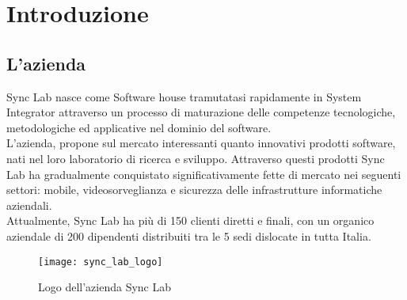 
\chapter{Introduzione}
\label{cap:introduzione}





\section{L'azienda}

Sync Lab nasce come Software house tramutatasi rapidamente in System Integrator attraverso un processo di maturazione delle competenze tecnologiche, metodologiche ed applicative nel dominio del software. \\
L'azienda, propone sul mercato interessanti quanto innovativi prodotti software, nati nel loro laboratorio di ricerca e sviluppo. Attraverso questi prodotti Sync Lab ha gradualmente conquistato significativamente fette di mercato nei seguenti settori: mobile, videosorveglianza e sicurezza delle infrastrutture informatiche aziendali. \\
Attualmente, Sync Lab ha più di 150 clienti diretti e finali, con un organico aziendale di 200 dipendenti distribuiti tra le 5 sedi dislocate in tutta Italia.

\begin{figure}[!h] 
    \centering 
    \texttt{[image: sync\_lab\_logo]} 
    \caption{Logo dell'azienda Sync Lab}
\end{figure}

